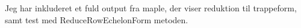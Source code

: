 Jeg har inkluderet et fuld output fra maple, der viser reduktion til trappeform,
samt test med ReduceRowEchelonForm metoden.